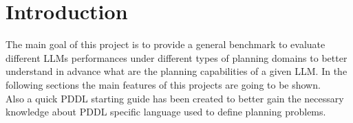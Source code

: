 \section{Introduction}
The main goal of this project is to provide a general benchmark to evaluate different LLMs performances under different types of planning domains to better understand in advance what are the planning capabilities of a given LLM. In the following sections the main features of this projects are going to be shown.\\
Also a quick PDDL starting guide has been created to better gain the necessary knowledge about PDDL specific language used to define planning problems.

